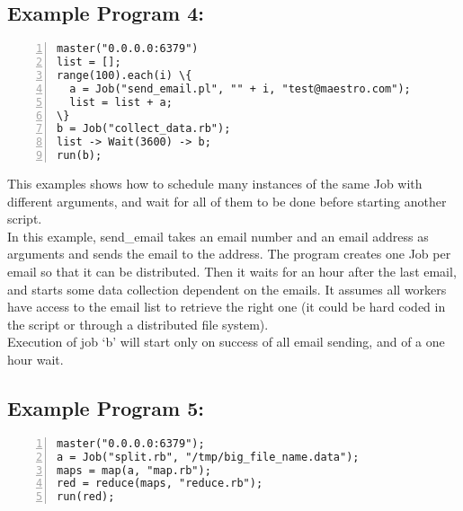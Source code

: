 \subsection*{Example Program 4:}
\begin{Verbatim}[numbers=left,commandchars=\\\{\}]
master("0.0.0.0:6379")
list = [];
range(100).each(i) \{
  a = Job("send_email.pl", "" + i, "test@maestro.com");
  list = list + a;
\}
b = Job("collect_data.rb");
list -> Wait(3600) -> b;
run(b);
\end{Verbatim}

This examples shows how to schedule many instances of the same Job with different
arguments, and wait for all of them to be done before starting another script.\\
In this example, send\_email takes an email number and an email address as arguments
and sends the email to the address. The program creates one Job per email so that it
can be distributed. Then it waits for an hour after the last email, and starts some data
collection dependent on the emails. It assumes all workers have access to the email list
to retrieve the right one (it could be hard coded in the script or through a distributed
file system).\\
Execution of job `b' will start only on success of all email sending,
and of a one hour wait.

\subsection*{Example Program 5:}
\begin{Verbatim}[numbers=left,commandchars=\\\{\}]
master("0.0.0.0:6379");
a = Job("split.rb", "/tmp/big_file_name.data");
maps = map(a, "map.rb");
red = reduce(maps, "reduce.rb");
run(red);
\end{Verbatim}

